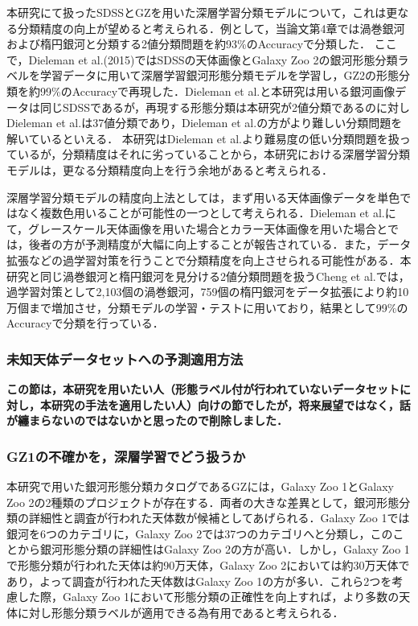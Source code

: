 \documentclass[a4j, 11pt]{jreport}
\begin{document}
本研究にて扱ったSDSSとGZを用いた深層学習分類モデルについて，これは更なる分類精度の向上が望めると考えられる．例として，当論文第4章では渦巻銀河および楕円銀河と分類する2値分類問題を約93\%のAccuracyで分類した．
ここで，Dieleman et al.(2015)\cite{Dieleman2015}ではSDSSの天体画像とGalaxy Zoo 2の銀河形態分類ラベルを学習データに用いて深層学習銀河形態分類モデルを学習し，GZ2の形態分類を約99\%のAccuracyで再現した．Dieleman et al.と本研究は用いる銀河画像データは同じSDSSであるが，再現する形態分類は本研究が2値分類であるのに対しDieleman et al.は37値分類であり，Dieleman et al.の方がより難しい分類問題を解いているといえる．
本研究はDieleman et al.より難易度の低い分類問題を扱っているが，分類精度はそれに劣っていることから，本研究における深層学習分類モデルは，更なる分類精度向上を行う余地があると考えられる．

深層学習分類モデルの精度向上法としては，まず用いる天体画像データを単色ではなく複数色用いることが可能性の一つとして考えられる．Dieleman et al.にて，グレースケール天体画像を用いた場合とカラー天体画像を用いた場合とでは，後者の方が予測精度が大幅に向上することが報告されている．また，データ拡張などの過学習対策を行うことで分類精度を向上させられる可能性がある．本研究と同じ渦巻銀河と楕円銀河を見分ける2値分類問題を扱うCheng et al.では，過学習対策として2,103個の渦巻銀河，759個の楕円銀河をデータ拡張により約10万個まで増加させ，分類モデルの学習・テストに用いており，結果として99\%のAccuracyで分類を行っている．

\subsubsection{未知天体データセットへの予測適用方法}
\textbf{この節は，本研究を用いたい人（形態ラベル付が行われていないデータセットに対し，本研究の手法を適用したい人）向けの節でしたが，将来展望ではなく，話が纏まらないのではないかと思ったので削除しました．}

\subsubsection{GZ1の不確かを，深層学習でどう扱うか}
本研究で用いた銀河形態分類カタログであるGZには，Galaxy Zoo 1とGalaxy Zoo 2の2種類のプロジェクトが存在する．両者の大きな差異として，銀河形態分類の詳細性と調査が行われた天体数が候補としてあげられる．Galaxy Zoo 1では銀河を6つのカテゴリに，Galaxy Zoo 2では37つのカテゴリへと分類し，このことから銀河形態分類の詳細性はGalaxy Zoo 2の方が高い．しかし，Galaxy Zoo 1で形態分類が行われた天体は約90万天体，Galaxy Zoo 2においては約30万天体であり，よって調査が行われた天体数はGalaxy Zoo 1の方が多い．これら2つを考慮した際，Galaxy Zoo 1において形態分類の正確性を向上すれば，より多数の天体に対し形態分類ラベルが適用できる為有用であると考えられる．
\end{document}
